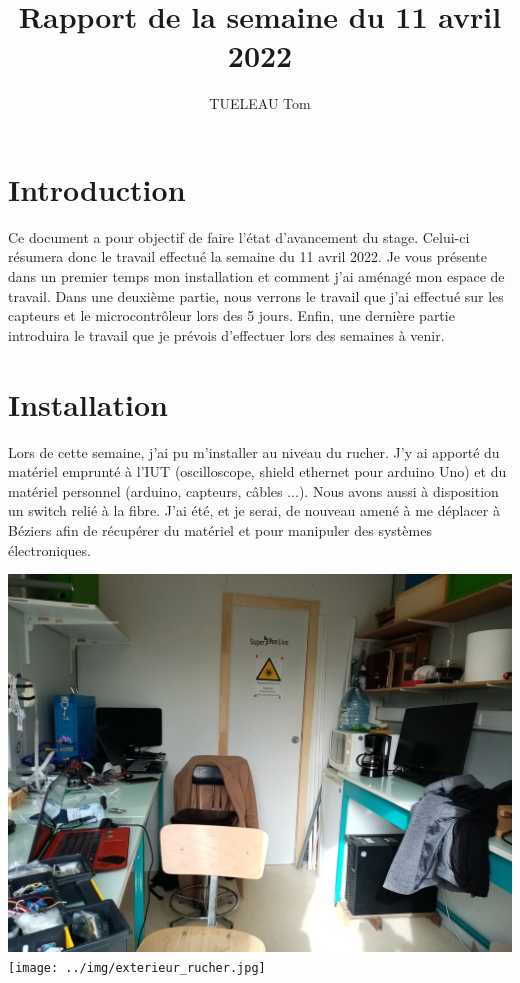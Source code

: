 \documentclass[12pt]{article}
\title{Rapport de la semaine du 11 avril 2022}
\author{TUELEAU Tom}
\begin{document}
\maketitle
\section{Introduction}
Ce document a pour objectif de faire l'état d'avancement du stage. Celui-ci résumera donc le travail effectué la semaine du 11 avril 2022.
Je vous présente dans un premier temps mon installation et comment j'ai aménagé mon espace de travail. Dans une deuxième partie,
nous verrons le travail que j'ai effectué sur les capteurs et le microcontrôleur lors des 5 jours. Enfin, une dernière partie introduira le travail 
que je prévois d'effectuer lors des semaines à venir. 

\section{Installation}
Lors de cette semaine, j'ai pu m'installer au niveau du rucher. J'y ai apporté du matériel emprunté à l'IUT (oscilloscope, shield ethernet pour
arduino Uno) et du matériel personnel (arduino, capteurs, câbles ...). Nous avons aussi à disposition un switch relié à la fibre. J'ai été, et je serai,
de nouveau amené à me déplacer à Béziers afin de récupérer du matériel et pour manipuler des systèmes électroniques.

\begin{center}	
\includegraphics[scale=0.075]{../img/interieur_rucher.jpg}
\label{image1}
\texttt{[image: ../img/exterieur\_rucher.jpg]}
\label{image2}
\end{center}
\end{document}
